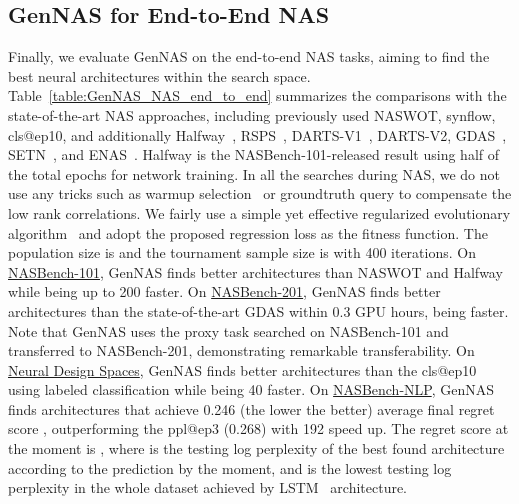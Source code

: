 \documentclass{article}
\begin{document}
\vspace{-8pt}

\subsection{GenNAS for End-to-End NAS}
\label{sec:exp-nas-search}






Finally, we evaluate GenNAS on the end-to-end NAS tasks, aiming to find the best neural architectures within the search space.
Table~\ref{table:GenNAS_NAS_end_to_end} summarizes the comparisons with the state-of-the-art NAS approaches, including previously used NASWOT, synflow, cls@ep10, and additionally Halfway~\cite{ying2019bench}, RSPS~\cite{li2020random}, DARTS-V1~\cite{liu2018darts}, DARTS-V2, GDAS~\cite{dong2019searching}, SETN~\cite{dong2019one}, and ENAS~\cite{pham2018efficient}.
Halfway is the NASBench-101-released result using half of the total epochs for network training.
In all the searches during NAS, we do not use any tricks such as warmup selection~\cite{abdelfattah2021zero} or groundtruth query to compensate the low rank correlations. 
We fairly use a simple yet effective regularized evolutionary algorithm~\cite{real2019regularized} and adopt the proposed regression loss as the fitness function. 
The population size is  and the tournament sample size is  with 400 iterations.
On \underline{NASBench-101}, GenNAS finds better architectures than NASWOT and Halfway while being up to 200 faster.
On \underline{NASBench-201}, GenNAS finds better architectures than the state-of-the-art GDAS within 0.3 GPU hours, being  faster.
Note that GenNAS uses the proxy task searched on NASBench-101 and transferred to NASBench-201, demonstrating remarkable transferability.
On \underline{Neural Design Spaces}, GenNAS finds better architectures than the cls@ep10 using labeled classification while being 40 faster.
On \underline{NASBench-NLP}, GenNAS finds architectures that achieve 0.246 (the lower the better) average final regret score , outperforming the ppl@ep3 (0.268) with 192 speed up. The regret score  at the moment  is , where  is the testing log perplexity of the best found architecture according to the prediction by the moment, and  is the lowest testing log perplexity in the whole dataset achieved by LSTM~\cite{hochreiter1997long} architecture. 
\end{document}
